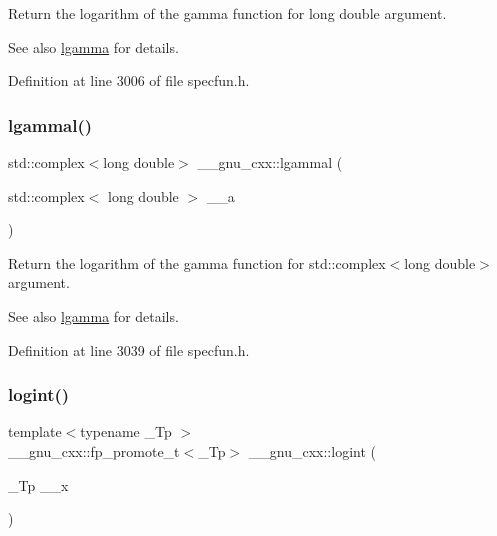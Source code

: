 Return the logarithm of the gamma function for {\ttfamily  long double } argument.

\begin{DoxySeeAlso}{See also}
\hyperlink{group__gnu__math__spec__func_ga40fa5127f7c419ed1d8f1c6a6f96ea9b}{lgamma} for details. 
\end{DoxySeeAlso}


Definition at line 3006 of file specfun.\+h.

\mbox{\label{group__gnu__math__spec__func_ga5f12f60afe9a47f4ca04964f642bbf0d}} 
\subsubsection{\texorpdfstring{lgammal()}{lgammal()}\hspace{0.1cm}{\footnotesize\ttfamily [2/2]}}
{\footnotesize\ttfamily std\+::complex$<$long double$>$ \+\_\+\+\_\+gnu\+\_\+cxx\+::lgammal (\begin{DoxyParamCaption}\item[{std\+::complex$<$ long double $>$}]{\+\_\+\+\_\+a }\end{DoxyParamCaption})\hspace{0.3cm}{\ttfamily [inline]}}

Return the logarithm of the gamma function for {\ttfamily  std\+::complex$<$long double$>$ } argument.

\begin{DoxySeeAlso}{See also}
\hyperlink{group__gnu__math__spec__func_ga40fa5127f7c419ed1d8f1c6a6f96ea9b}{lgamma} for details. 
\end{DoxySeeAlso}


Definition at line 3039 of file specfun.\+h.

\mbox{\label{group__gnu__math__spec__func_ga1c0fe0f4cb72041f24db82dc7e47df11}} 
\subsubsection{\texorpdfstring{logint()}{logint()}}
{\footnotesize\ttfamily template$<$typename \+\_\+\+Tp $>$ \\
\+\_\+\+\_\+gnu\+\_\+cxx\+::fp\+\_\+promote\+\_\+t$<$\+\_\+\+Tp$>$ \+\_\+\+\_\+gnu\+\_\+cxx\+::logint (\begin{DoxyParamCaption}\item[{\+\_\+\+Tp}]{\+\_\+\+\_\+x }\end{DoxyParamCaption})\hspace{0.3cm}{\ttfamily [inline]}}

